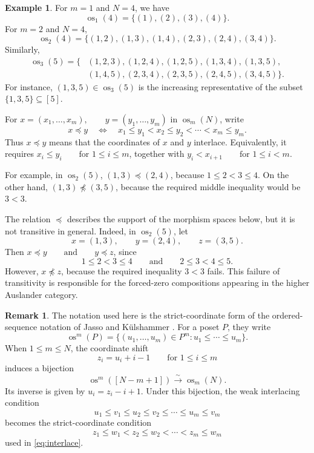 \documentclass[12pt,a4paper,english,reqno]{amsart}
\theoremstyle{plain}
\theoremstyle{definition}
\newtheorem{exm}[theorem]{Example}
\newtheorem{remark}[theorem]{Remark}
\newcommand{\os}{\operatorname{os}}
\begin{document}
\begin{exm}

For $m=1$ and $N=4$, we have
\[
\os_1(4)=\{(1),(2),(3),(4)\}.
\]
For $m=2$ and $N=4$,
\[
\os_2(4)
=
\{(1,2),(1,3),(1,4),(2,3),(2,4),(3,4)\}.
\]
Similarly,
\[
\begin{split}
\os_3(5)=\{&
(1,2,3),(1,2,4),(1,2,5),(1,3,4),(1,3,5),\\
&
(1,4,5),(2,3,4),(2,3,5),(2,4,5),(3,4,5)
\}.
\end{split}
\]
For instance, $(1,3,5)\in\os_3(5)$ is the increasing representative
of the subset $\{1,3,5\}\subseteq[5]$.

For $x=(x_1,\ldots,x_m),\qquad
y=(y_1,\ldots,y_m)$
in $\os_m(N)$, write
\begin{equation}
x\preceq y
\quad\Longleftrightarrow\quad
x_1\leq y_1<x_2\leq y_2<\cdots<x_m\leq y_m.
\label{eq:interlace}
\end{equation}
Thus $x\preceq y$ means that the coordinates of $x$ and $y$
interlace. Equivalently, it requires $x_i\leq y_i
\qquad\text{for }1\leq i\leq m$,
together with $y_i<x_{i+1}
\qquad\text{for }1\leq i<m$.

For example, in $\os_2(5)$, $(1,3)\preceq(2,4)$,
because $1\leq2<3\leq4$.
On the other hand, $(1,3)\npreceq(3,5)$,
because the required middle inequality would be $3<3$.

The relation $\preceq$ describes the support of the morphism spaces
below, but it is not transitive in general. Indeed, in $\os_2(5)$, let
\[
x=(1,3),\qquad y=(2,4),\qquad z=(3,5).
\]
Then $x\preceq y
\qquad\text{and}\qquad
y\preceq z$,
since
\[
1\leq2<3\leq4
\qquad\text{and}\qquad
2\leq3<4\leq5.
\]
However, $x\npreceq z$,
because the required inequality $3<3$ fails. This failure of
transitivity is responsible for the forced-zero compositions appearing
in the higher Auslander category.
\end{exm}



\begin{remark}
The notation used here is the strict-coordinate form of the
ordered-sequence notation of Jasso and K\"ulshammer
\cite[Definition~1.9]{JassoKulshammer}. For a poset $P$, they write
\[
\operatorname{os}^{m}(P)
=
\{(u_1,\ldots,u_m)\in P^m:
u_1\leq\cdots\leq u_m\}.
\]
When $1\leq m\leq N$, the coordinate shift
\[
z_i=u_i+i-1
\qquad\text{for }1\leq i\leq m
\]
induces a bijection
\[
\operatorname{os}^{m}([N-m+1])
\xrightarrow{\sim}
\os_m(N).
\]
Its inverse is given by $u_i=z_i-i+1$.
Under this bijection, the weak interlacing condition
\[
u_1\leq v_1\leq u_2\leq v_2
\leq\cdots\leq u_m\leq v_m
\]
becomes the strict-coordinate condition
\[
z_1\leq w_1<z_2\leq w_2
<\cdots<z_m\leq w_m
\]
used in \eqref{eq:interlace}.
\end{remark}
\end{document}

